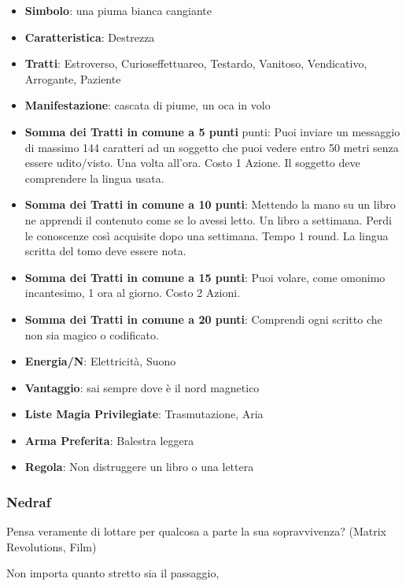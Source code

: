 \begin{multicols}{2}
\begin{itemize}[leftmargin=*] \setlength{\itemsep}{0pt}
\item \textbf{Simbolo}: una piuma bianca cangiante
\item \textbf{Caratteristica}: Destrezza
\item \textbf{Tratti}: Estroverso, Curioseffettuareo, Testardo, Vanitoso, Vendicativo, Arrogante, Paziente
\item \textbf{Manifestazione}: cascata di piume, un oca in volo
\item \textbf{Somma dei Tratti in comune a 5 punti} punti: Puoi inviare un messaggio di massimo 144 caratteri ad un soggetto che puoi vedere entro 50 metri senza essere udito/visto. Una volta all'ora. Costo 1 Azione. Il soggetto deve comprendere la lingua usata.
\item \textbf{Somma dei Tratti in comune a 10 punti}: Mettendo la mano su un libro ne apprendi il contenuto come se lo avessi letto. Un libro a settimana. Perdi le conoscenze così acquisite dopo una settimana. Tempo 1 round. La lingua scritta del tomo deve essere nota.
\item \textbf{Somma dei Tratti in comune a 15 punti}: Puoi volare, come omonimo incantesimo, 1 ora al giorno. Costo 2 Azioni.
\item \textbf{Somma dei Tratti in comune a 20 punti}: Comprendi ogni scritto che non sia magico o codificato.
\item \textbf{Energia/N}: Elettricità, Suono
\item \textbf{Vantaggio}: sai sempre dove è il nord magnetico
\item \textbf{Liste Magia Privilegiate}: Trasmutazione, Aria
\item \textbf{Arma Preferita}: Balestra leggera
\item \textbf{Regola}: Non distruggere un libro o una lettera
\end{itemize}

\subsubsection{Nedraf}\label{nedraf}\hypertarget{nedraf}{}

\begin{enfasi}{
Pensa veramente di lottare per qualcosa a parte la sua sopravvivenza? (Matrix Revolutions, Film)

\medskip

Non importa quanto stretto sia il passaggio,

}
\end{enfasi}
\end{multicols}
